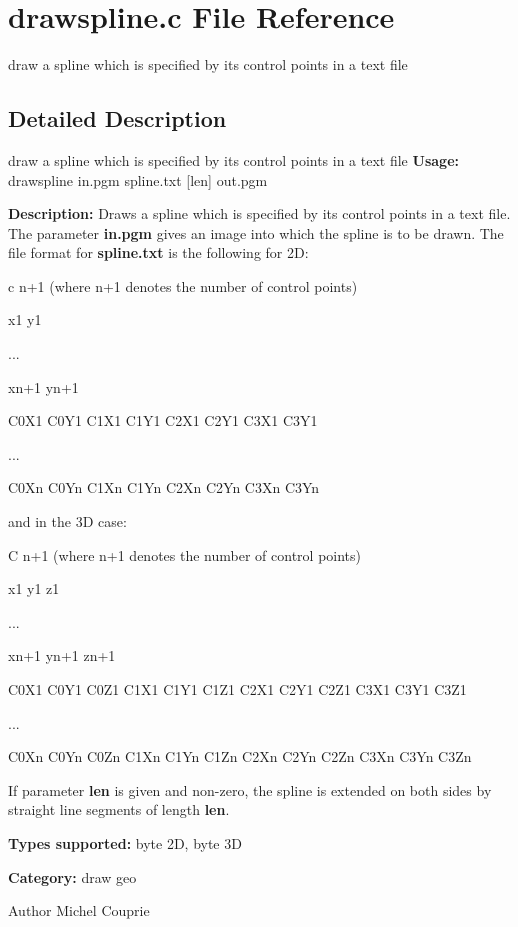 \section{drawspline.c File Reference}
\label{drawspline_8c}


draw a spline which is specified by its control points in a text file  




\subsection{Detailed Description}
draw a spline which is specified by its control points in a text file {\bfseries Usage:} drawspline in.pgm spline.txt [len] out.pgm

{\bfseries Description:} Draws a spline which is specified by its control points in a text file. The parameter {\bfseries in.pgm} gives an image into which the spline is to be drawn. The file format for {\bfseries spline.txt} is the following for 2D:

c n+1 (where n+1 denotes the number of control points)\par
 x1 y1\par
 ...\par
 xn+1 yn+1\par
 C0X1 C0Y1 C1X1 C1Y1 C2X1 C2Y1 C3X1 C3Y1\par
 ...\par
 C0Xn C0Yn C1Xn C1Yn C2Xn C2Yn C3Xn C3Yn\par


and in the 3D case:

C n+1 (where n+1 denotes the number of control points)\par
 x1 y1 z1\par
 ...\par
 xn+1 yn+1 zn+1\par
 C0X1 C0Y1 C0Z1 C1X1 C1Y1 C1Z1 C2X1 C2Y1 C2Z1 C3X1 C3Y1 C3Z1\par
 ...\par
 C0Xn C0Yn C0Zn C1Xn C1Yn C1Zn C2Xn C2Yn C2Zn C3Xn C3Yn C3Zn\par


If parameter {\bfseries len} is given and non-\/zero, the spline is extended on both sides by straight line segments of length {\bfseries len}.

{\bfseries Types supported:} byte 2D, byte 3D

{\bfseries Category:} draw geo

\begin{DoxyAuthor}{Author}
Michel Couprie 
\end{DoxyAuthor}
